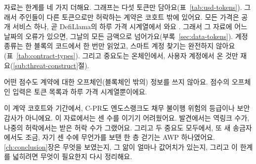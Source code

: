 자료는 한계를 네 가지 더해요. 그래프는 다섯 토큰만 담아요(표~\ref{tab:usd-tokens}). 그래서 주인들이 다른 토큰으로만 허락하는 계약은 코호트 밖에 있어요. 모든 가격은 공개 서비스 하나, 곧 DefiLlama의 하루 가격 시계열에서 와요 \parencite{defillamanddocs}. 그래서 그 자료에 어느 날짜의 오류가 있으면, 그날의 모든 금액으로 넘어가요(부록~\ref{sec:data-tokens}). 계정 종류는 한 블록의 코드에서 한 번만 읽었고, 스마트 계정 찾기는 완전하지 않아요(표~\ref{tab:contract-types}). 그리고 중요도는 온체인에서, 사용자 계정에서 온 것만 재요(\ref{sub:threat-construct}절).

어떤 점수도 계약에 대한 오프체인(블록체인 밖의) 정보를 쓰지 않아요. 점수의 오프체인 입력은 토큰 목록과 하루 가격 시계열뿐이에요.

이 계약 코호트와 기간에서, \mbox{C-PR}도 엔도스랭크도 채무 불이행 위험의 등급이나 보안 감사가 아니에요. 이 자료에서는 센 수를 이기기 어려웠어요. 발견에서는 역링크 수가, 나중의 허락에서는 받은 허락 수가 그랬어요. 그리고 두 중요도 모두에서, 또 새 송금자에서도 조금, 자기 센 수에 무언가를 보탠 한 층 걷기는 AWP 하나였어요. \ref{ch:conclusion}장은 무엇을 보였는지, 그 앎이 얼마나 값어치가 있는지, 그리고 이 한계를 넓히려면 무엇이 필요한지 다시 정리해요.
